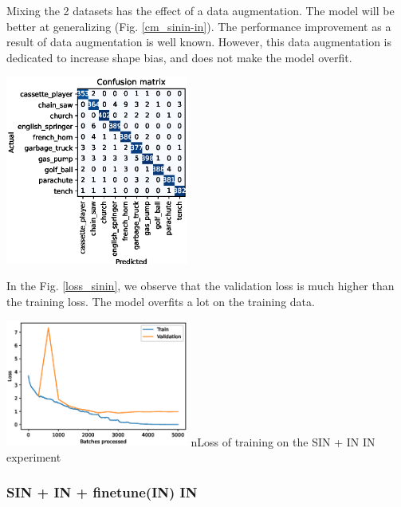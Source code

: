 \documentclass{article}
\begin{document}
Mixing the 2 datasets has the effect of a data augmentation. The model will be better
at generalizing (Fig. \ref{cm_sinin-in}). The performance improvement as a result of data augmentation 
is well known. However, this data augmentation is dedicated to increase shape bias,
and does not make the model overfit.

\begin{center}
  \captionsetup{type=figure}
  \includegraphics[width = 0.45\textwidth]{imgs/sinin/sinin-in_confusion_matrix_0.973.eps}
  \label{cm_sinin-in}
\end{center}

In the Fig. \ref{loss_sinin}, we observe that the validation loss is much higher than the training
loss. The model overfits a lot on the training data.


\begin{center}
  \captionsetup{type=figure}
  \includegraphics[width = 0.45\textwidth]{imgs/sinin/loss.eps}
  n{Loss of training on the SIN + IN \texorpdfstring{\textrightarrow} .IN experiment}
  \label{loss_sinin}
\end{center}

\subsubsection{SIN + IN + finetune(IN) \texorpdfstring{\textrightarrow} .IN}
\end{document}
